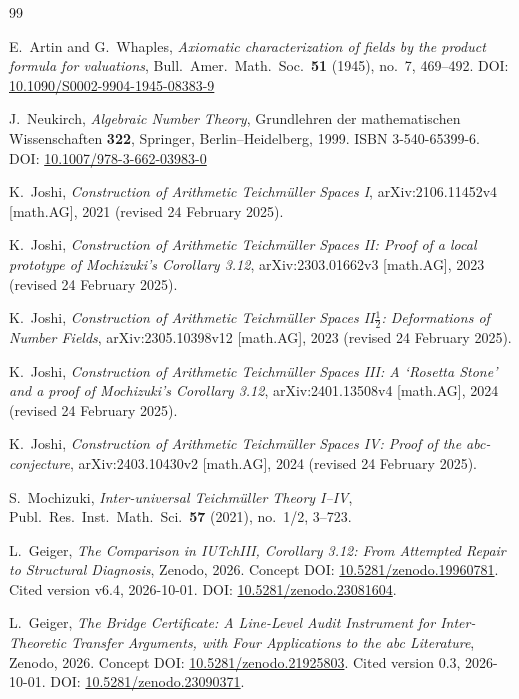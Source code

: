 \documentclass[11pt,a4paper]{article}
\theoremstyle{definition}
\theoremstyle{remark}
\begin{document}
\begin{thebibliography}{99}
\raggedright

E.~Artin and G.~Whaples,
\emph{Axiomatic characterization of fields by the product formula for
valuations},
Bull.\ Amer.\ Math.\ Soc.\ \textbf{51} (1945), no.~7, 469--492.
DOI: \href{https://doi.org/10.1090/S0002-9904-1945-08383-9}{10.1090/S0002-9904-1945-08383-9}

J.~Neukirch,
\emph{Algebraic Number Theory},
Grundlehren der mathematischen Wissenschaften \textbf{322},
Springer, Berlin--Heidelberg, 1999.
ISBN 3-540-65399-6. DOI: \href{https://doi.org/10.1007/978-3-662-03983-0}{10.1007/978-3-662-03983-0}

K.~Joshi,
\emph{Construction of Arithmetic Teichmüller Spaces I},
arXiv:2106.11452v4 [math.AG], 2021 (revised 24 February 2025).

K.~Joshi,
\emph{Construction of Arithmetic Teichmüller Spaces II: Proof of a local
prototype of Mochizuki's Corollary 3.12},
arXiv:2303.01662v3 [math.AG], 2023 (revised 24 February 2025).

K.~Joshi,
\emph{Construction of Arithmetic Teichmüller Spaces II$\frac{1}{2}$:
Deformations of Number Fields},
arXiv:2305.10398v12 [math.AG], 2023 (revised 24 February 2025).

K.~Joshi,
\emph{Construction of Arithmetic Teichmüller Spaces III: A `Rosetta Stone'
and a proof of Mochizuki's Corollary 3.12},
arXiv:2401.13508v4 [math.AG], 2024 (revised 24 February 2025).

K.~Joshi,
\emph{Construction of Arithmetic Teichmüller Spaces IV: Proof of the
abc-conjecture},
arXiv:2403.10430v2 [math.AG], 2024 (revised 24 February 2025).

S.~Mochizuki,
\emph{Inter-universal Teichmüller Theory I--IV},
Publ.\ Res.\ Inst.\ Math.\ Sci.\ \textbf{57} (2021), no.~1/2, 3--723.

L.~Geiger,
\emph{The Comparison in IUTchIII, Corollary 3.12: From Attempted Repair to Structural Diagnosis},
Zenodo, 2026.
Concept DOI: \href{https://doi.org/10.5281/zenodo.19960781}{10.5281/zenodo.19960781}.
Cited version v6.4, 2026-10-01.
DOI: \href{https://doi.org/10.5281/zenodo.23081604}{10.5281/zenodo.23081604}.

L.~Geiger,
\emph{The Bridge Certificate: A Line-Level Audit Instrument for Inter-Theoretic Transfer Arguments, with Four Applications to the abc Literature},
Zenodo, 2026.
Concept DOI: \href{https://doi.org/10.5281/zenodo.21925803}{10.5281/zenodo.21925803}.
Cited version 0.3, 2026-10-01.
DOI: \href{https://doi.org/10.5281/zenodo.23090371}{10.5281/zenodo.23090371}.


\end{thebibliography}
\end{document}
